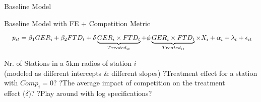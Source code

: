 

\begin{frame}{Baseline Model}

\vspace{-0.7cm}

\begin{block}{Baseline Model with FE + Competition Metric}

\small

\vspace{-0.3cm}


\begin{equation}
\label{eq:Base_DiD4}
\resizebox{\textwidth}{!}{
$\displaystyle
p_{it} = \beta_{1} GER_{i} + \beta_{2} FTD_{t} + \delta \underbrace{GER_{i} \times FTD_{t}}_{Treated_{it}} + \phi \underbrace{GER_{i} \times FTD_{t}}_{Treated_{it}} \times X_{i} + \alpha_{i} + \lambda_{t} + \epsilon_{it}
$}
\end{equation}


\end{block}


\begin{outline}
        \1  Nr. of Stations in a 5km radios of station $i$ \\
        \makebox[0.9cm][l]{} (modeled as different intercepts \& different slopes)
        \1 \makebox[0.9cm][l]{$\delta$:} \textcolor{BrickRed}{?}Treatment effect for a station with $Comp_{i} = 0$\textcolor{BrickRed}{?}
        \1 \makebox[0.9cm][l]{$\phi$:} \textcolor{BrickRed}{?}The average impact of competition on the treatment \\
        \makebox[1.15cm][l]{} effect ($\delta$)\textcolor{BrickRed}{?}
        \1 \makebox[0.9cm][l]{} \textcolor{BrickRed}{?}Play around with log specifications\textcolor{BrickRed}{?}
      \end{outline}



\end{frame}










